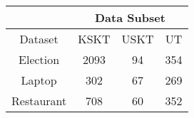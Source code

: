 \begin{tabular}{|c|c|c|c|}
\hline
            &  \multicolumn{3}{c|}{Data Subset} \\
\hline
Dataset     &  KSKT &  USKT &  UT  \\
\hline
Election    & 2093  & 94    &  354 \\
\hline
Laptop      & 302   & 67    &  269 \\
\hline
Restaurant  & 708   & 60    &  352 \\
\hline
\end{tabular}